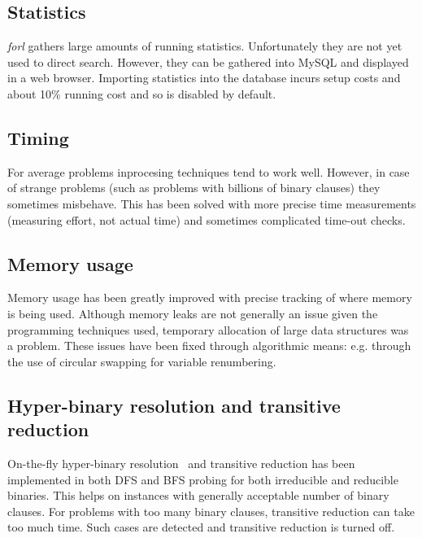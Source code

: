 \documentclass[final]{ieee}
\begin{document}
\subsection{Statistics}
\emph{forl} gathers large amounts of running statistics. Unfortunately they are not yet used to direct search. However, they can be gathered into MySQL and displayed in a web browser. Importing statistics into the database incurs setup costs and about 10\% running cost and so is disabled by default.

\subsection{Timing}
For average problems inprocesing techniques tend to work well. However, in case of strange problems (such as problems with billions of binary clauses) they sometimes misbehave. This has been solved with more precise time measurements (measuring effort, not actual time) and sometimes complicated time-out checks.

\subsection{Memory usage}
Memory usage has been greatly improved with precise tracking of where memory is being used. Although memory leaks are not generally an issue given the programming techniques used, temporary allocation of large data structures was a problem. These issues have been fixed through algorithmic means: e.g. through the use of circular swapping for variable renumbering.

\subsection{Hyper-binary resolution and transitive reduction}
On-the-fly hyper-binary resolution~\cite{DBLP:conf/sat/BacchusW03} and transitive reduction has been implemented in both DFS and BFS probing for both irreducible and reducible binaries. This helps on instances with generally acceptable number of binary clauses. For problems with too many binary clauses, transitive reduction can take too much time. Such cases are detected and transitive reduction is turned off.
\end{document}
